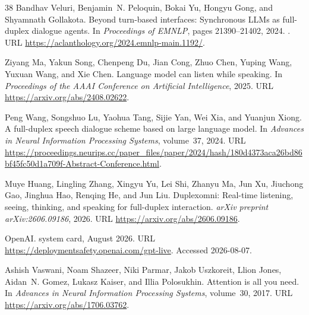 \documentclass[UTF8,fontset=none,a4paper,10pt]{ctexart}
\begin{document}
{\begin{thebibliography}{38}
Bandhav Veluri, Benjamin~N. Peloquin, Bokai Yu, Hongyu Gong, and Shyamnath
  Gollakota.
\newblock Beyond turn-based interfaces: Synchronous {LLM}s as full-duplex
  dialogue agents.
\newblock In \emph{Proceedings of EMNLP}, pages 21390--21402, 2024.
\newblock {}.
\newblock URL \url{https://aclanthology.org/2024.emnlp-main.1192/}.

Ziyang Ma, Yakun Song, Chenpeng Du, Jian Cong, Zhuo Chen, Yuping Wang, Yuxuan
  Wang, and Xie Chen.
\newblock Language model can listen while speaking.
\newblock In \emph{Proceedings of the AAAI Conference on Artificial
  Intelligence}, 2025.
\newblock URL \url{https://arxiv.org/abs/2408.02622}.

Peng Wang, Songshuo Lu, Yaohua Tang, Sijie Yan, Wei Xia, and Yuanjun Xiong.
\newblock A full-duplex speech dialogue scheme based on large language model.
\newblock In \emph{Advances in Neural Information Processing Systems},
  volume~37, 2024{}.
\newblock URL
  \url{https://proceedings.neurips.cc/paper_files/paper/2024/hash/180d4373aca26bd86bf45fc50d1a709f-Abstract-Conference.html}.

Muye Huang, Lingling Zhang, Xingyu Yu, Lei Shi, Zhanyu Ma, Jun Xu, Jiuchong
  Gao, Jinghua Hao, Renqing He, and Jun Liu.
\newblock Duplexomni: Real-time listening, seeing, thinking, and speaking for
  full-duplex interaction.
\newblock \emph{arXiv preprint arXiv:2606.09186}, 2026.
\newblock URL \url{https://arxiv.org/abs/2606.09186}.

{OpenAI}.
 system card, August 2026{}.
\newblock URL \url{https://deploymentsafety.openai.com/gpt-live}.
\newblock Accessed 2026-08-07.

Ashish Vaswani, Noam Shazeer, Niki Parmar, Jakob Uszkoreit, Llion Jones,
  Aidan~N. Gomez, Lukasz Kaiser, and Illia Polosukhin.
\newblock Attention is all you need.
\newblock In \emph{Advances in Neural Information Processing Systems},
  volume~30, 2017.
\newblock URL \url{https://arxiv.org/abs/1706.03762}.


\end{thebibliography}}
\end{document}
